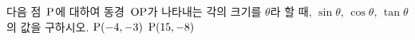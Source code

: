 다음 점~$\mathrm{P}$에 대하여 동경~$\mathrm{OP}$가 나타내는 각의 크기를 $\theta$라 할 때, $\sin\theta$, $\cos\theta$, $\tan\theta$의 값을 구하시오. 
 $\mathrm{P}(-4{,}\mkern3mu\mathopen{}-3)$
 $\mathrm{P}(15{,}\mkern3mu\mathopen{}-8)$

